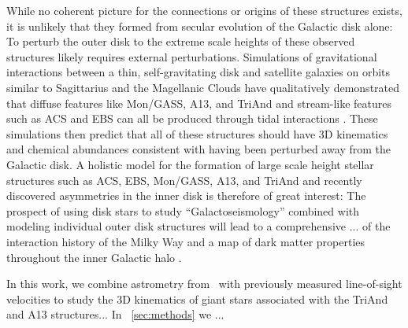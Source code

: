 \documentclass[twocolumn]{aastex62}
\newcommand{\gaia}{\project{Gaia}}
\begin{document}
While no coherent picture for the connections or origins of these structures
exists, it is unlikely that they formed from secular evolution of the Galactic
disk alone:
To perturb the outer disk to the extreme scale heights of these observed
structures likely requires external perturbations.
Simulations of gravitational interactions between a thin, self-gravitating disk
and satellite galaxies on orbits similar to Sagittarius and the Magellanic
Clouds have qualitatively demonstrated that diffuse features like Mon/GASS, A13,
and TriAnd and stream-like features such as ACS and EBS can all be produced
through tidal interactions \citep{Purcell:2011, Price-Whelan:2015, Gomez:2016,
Laporte:2018, Laporte:2018a}.
These simulations then predict that all of these structures should have 3D
kinematics and chemical abundances consistent with having been perturbed away
from the Galactic disk.
A holistic model for the formation of large scale height stellar structures such
as ACS, EBS, Mon/GASS, A13, and TriAnd and recently discovered asymmetries in
the inner disk \citep[e.g.,][]{Widrow:2012, Antoja:2018} is therefore of great
interest:
The prospect of using disk stars to study ``Galactoseismology'' combined with
modeling individual outer disk structures will lead to a comprehensive ... of
the interaction history of the Milky Way and a map of dark matter properties
throughout the inner Galactic halo \citep[e.g.,][]{Widrow:2012, Laporte:2018b}.

In this work, we combine astrometry from \gaia\ with previously measured
line-of-sight velocities to study the 3D kinematics of giant stars associated
with the TriAnd and A13 structures...
In \sectionname~\ref{sec:methods} we ...

\end{document}

